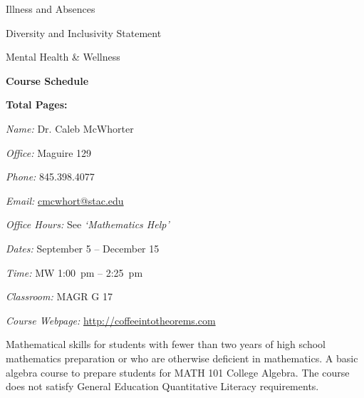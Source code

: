 \documentclass[11pt,letterpaper]{article}
\makeatletter
\newcommand{\classdates}{September 5 -- December 15}
\newcommand{\classtimes}{MW 1:00~pm -- 2:25~pm}
\newcommand{\classroom}{MAGR G 17}
\newcommand{\instructor}{Dr. Caleb McWhorter}
\newcommand{\office}{Maguire 129}
\newcommand{\phone}{845.398.4077}
\newcommand{\email}{cmcwhort@stac.edu}
\newcommand{\website}{http://coffeeintotheorems.com}
\newcommand{\officehours}{See \textit{`Mathematics Help'}}
\makeatother
\begin{document}
\begin{minipage}[t]{0.45\textwidth}
\hspace{0.3cm} Illness and Absences \dotfill \pageref{college_illnessabsences} \par
\hspace{0.3cm} Diversity and Inclusivity Statement \dotfill \pageref{college_inclusive} \par
\hspace{0.3cm} Mental Health \& Wellness \dotfill \pageref{mental_wellness} \par
{\bfseries\color{stacred} Course Schedule} \dotfill \pageref{schd} \par
\hfill {\bfseries\color{stacred} Total Pages:} \pageref*{LastPage}
\end{minipage} \pspace









\textit{Name:} \instructor \par
\textit{Office:} \office \par
\textit{Phone:} \phone \par
\textit{Email:} \href{mailto:\email}{\email} \par
\textit{Office Hours:} \officehours 
\sectionbreak



\textit{Dates:} \classdates \par
\textit{Time:} \classtimes \par
\textit{Classroom:} \classroom \par
\textit{Course Webpage:} \href{\website}{\website}
\sectionbreak



Mathematical skills for students with fewer than two years of high school mathematics preparation or who are otherwise deficient in mathematics. A basic algebra course to prepare students for MATH 101 College Algebra. The course does not satisfy General Education Quantitative Literacy requirements.
\pspace
\end{document}
